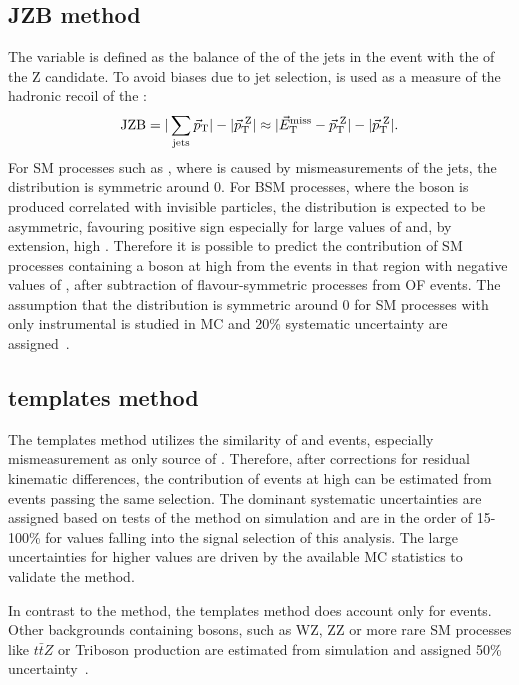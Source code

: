 \subsection{JZB method}
The \JZB variable is defined as the balance of the \pt of the jets in the event with the \pt of the Z candidate. To avoid biases due to jet selection, \METVec is used as a measure of the hadronic recoil of the \Z:
\begin{equation}
\textrm{JZB} = | \sum\limits_{\mathrm{jets}}\vec{p}_{\mathrm{T}}| - | \vec{p}_{\mathrm{T}}^{\text{ }\mathrm{Z}}| \approx | \vec{E}_{\mathrm{T}}^{\mathrm{miss}} -  \vec{p}_{\mathrm{T}}^{\text{ }\mathrm{ Z}}| - |\vec{p}_{\mathrm{T}}^{\text{ }\mathrm{Z}}| .
\end{equation}
For SM processes such as \zjets, where \MET is caused by mismeasurements of the jets, the \JZB distribution is symmetric around 0. For BSM processes, where the \Z boson is produced correlated with invisible particles, the \JZB distribution is expected to be asymmetric, favouring positive sign especially for large values of \JZB and, by extension, high \MET. Therefore it is possible to predict the contribution of SM processes containing a \Z boson at high \MET from the events in that region with negative values of \JZB, after subtraction of flavour-symmetric processes from OF events. The assumption that the \JZB distribution is symmetric around 0 for SM processes with only instrumental \MET is studied in MC and 20\% systematic uncertainty are assigned~\cite{Khachatryan:2015lwa}.
\subsection{\MET templates method}
The \MET templates method utilizes the similarity of \zjets and \gjets events, especially mismeasurement as only source of \MET. Therefore, after corrections for residual kinematic differences, the contribution of \zjets events at high \MET can be estimated from \gjets events passing the same selection. The dominant systematic uncertainties are assigned based on tests of the method on simulation and are in the order of 15-100\% for \MET values falling into the signal selection of this analysis. The large uncertainties for higher \MET values are driven by the available MC statistics to validate the method. 

In contrast to the \JZB method, the \MET templates method does account only for \zjets events. Other backgrounds containing \Z bosons, such as WZ, ZZ or more rare SM processes like $t\bar{t}Z$ or Triboson production are estimated from simulation and assigned 50\% uncertainty~\cite{Khachatryan:2015lwa}. 
